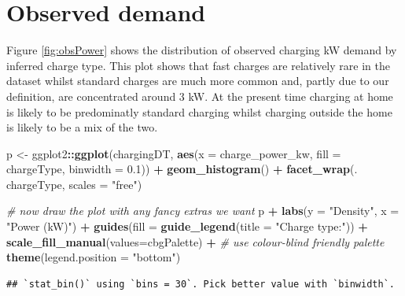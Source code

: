 \documentclass[]{article}
\newenvironment{Shaded}{\begin{snugshade}}{\end{snugshade}}
\newcommand{\KeywordTok}[1]{\textcolor[rgb]{0.13,0.29,0.53}{\textbf{#1}}}
\newcommand{\DataTypeTok}[1]{\textcolor[rgb]{0.13,0.29,0.53}{#1}}
\newcommand{\FloatTok}[1]{\textcolor[rgb]{0.00,0.00,0.81}{#1}}
\newcommand{\StringTok}[1]{\textcolor[rgb]{0.31,0.60,0.02}{#1}}
\newcommand{\CommentTok}[1]{\textcolor[rgb]{0.56,0.35,0.01}{\textit{#1}}}
\newcommand{\OperatorTok}[1]{\textcolor[rgb]{0.81,0.36,0.00}{\textbf{#1}}}
\newcommand{\NormalTok}[1]{#1}
\begin{document}
\section{Observed demand}\label{observed-demand}

Figure \ref{fig:obsPower} shows the distribution of observed charging kW
demand by inferred charge type. This plot shows that fast charges are
relatively rare in the dataset whilst standard charges are much more
common and, partly due to our definition, are concentrated around 3 kW.
At the present time charging at home is likely to be predominatly
standard charging whilst charging outside the home is likely to be a mix
of the two.

\begin{Shaded}
\begin{Highlighting}[]
\NormalTok{p <-}\StringTok{ }\NormalTok{ggplot2}\OperatorTok{::}\KeywordTok{ggplot}\NormalTok{(chargingDT, }\KeywordTok{aes}\NormalTok{(}\DataTypeTok{x =}\NormalTok{ charge_power_kw, }\DataTypeTok{fill =}\NormalTok{ chargeType, }\DataTypeTok{binwidth =} \FloatTok{0.1}\NormalTok{)) }\OperatorTok{+}
\StringTok{  }\KeywordTok{geom_histogram}\NormalTok{() }\OperatorTok{+}
\StringTok{  }\KeywordTok{facet_wrap}\NormalTok{(. }\OperatorTok{~}\StringTok{ }\NormalTok{chargeType, }\DataTypeTok{scales =} \StringTok{"free"}\NormalTok{)}

\CommentTok{# now draw the plot with any fancy extras we want}
\NormalTok{p }\OperatorTok{+}\StringTok{ }\KeywordTok{labs}\NormalTok{(}\DataTypeTok{y =} \StringTok{"Density"}\NormalTok{,}
       \DataTypeTok{x =} \StringTok{"Power (kW)"}\NormalTok{) }\OperatorTok{+}
\StringTok{  }\KeywordTok{guides}\NormalTok{(}\DataTypeTok{fill =} \KeywordTok{guide_legend}\NormalTok{(}\DataTypeTok{title =} \StringTok{"Charge type:"}\NormalTok{)) }\OperatorTok{+}
\StringTok{  }\KeywordTok{scale_fill_manual}\NormalTok{(}\DataTypeTok{values=}\NormalTok{cbgPalette) }\OperatorTok{+}\StringTok{ }\CommentTok{# use colour-blind friendly palette}
\StringTok{  }\KeywordTok{theme}\NormalTok{(}\DataTypeTok{legend.position =} \StringTok{"bottom"}\NormalTok{)}
\end{Highlighting}
\end{Shaded}

\begin{verbatim}
## `stat_bin()` using `bins = 30`. Pick better value with `binwidth`.
\end{verbatim}
\end{document}
